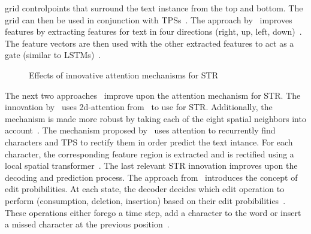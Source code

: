 grid controlpoints that surround the text instance from the top and bottom.
The grid can then be used in conjunction with \acp{TPS}~\citep{shi_aster_2019}.
The approach by~\cite{cheng_aon_2018} improves features by extracting features for text in
four directions (right, up, left, down)~\citep{cheng_aon_2018}.
The feature vectors are then used with the other extracted features to act as a gate (similar to
\acp{LSTM})~\citep{cheng_aon_2018}.
\begin{figure}[ht]
    \centering\scriptsize
    \caption{%
        Effects of innovative attention mechanisms for STR\label{fig:attention-examples}
    }
\end{figure}
The next two approaches~\citep{li_show_2019,liu_char-net_2018} improve upon the attention mechanism
for \ac{STR}.
The innovation by~\cite{li_show_2019} uses 2d-attention from~\citep{xu_show_2016} to use
for \ac{STR}.
Additionally, the mechanism is made more robust by taking each of the eight spatial neighbors into
account~\citep{li_show_2019}.
The mechanism proposed by~\cite{liu_char-net_2018} uses attention to recurrently find characters and
\ac{TPS} to rectify them in order predict the text intance.
For each character, the corresponding feature region is extracted and is
rectified using a local spatial transformer~\citep{liu_char-net_2018}.
The last relevant \ac{STR} innovation improves upon the decoding and prediction process.
The approach from~\cite{bai_edit_2018} introduces the concept of edit probibilities.
At each state, the decoder decides which edit operation to perform (consumption, deletion, insertion)
based on their edit probibilities~\citep{bai_edit_2018}.
These operations either forego a time step, add a character to the word or insert a missed character
at the previous position~\citep{bai_edit_2018}.

